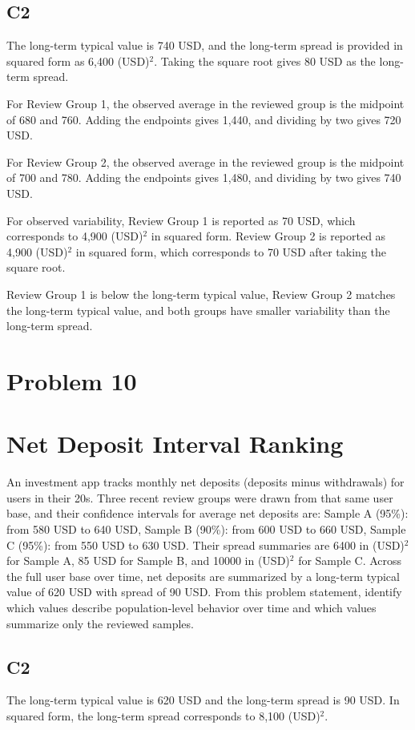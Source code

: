 \begin{ExamProblems}
\subsection*{C2}
		The long-term typical value is 740 USD, and the long-term spread is provided in squared form as 6,400 (USD)$^2$.
		Taking the square root gives 80 USD as the long-term spread.

		For Review Group 1, the observed average in the reviewed group is the midpoint of 680 and 760.
		Adding the endpoints gives 1,440, and dividing by two gives 720 USD.

		For Review Group 2, the observed average in the reviewed group is the midpoint of 700 and 780.
		Adding the endpoints gives 1,480, and dividing by two gives 740 USD.

		For observed variability, Review Group 1 is reported as 70 USD, which corresponds to 4,900 (USD)$^2$ in squared form.
		Review Group 2 is reported as 4,900 (USD)$^2$ in squared form, which corresponds to 70 USD after taking the square root.

		Review Group 1 is below the long-term typical value, Review Group 2 matches the long-term typical value, and both groups have smaller variability than the long-term spread.


		\newpage
		\item
		\section{Problem 10}
		\section{Net Deposit Interval Ranking}
		An investment app tracks monthly net deposits (deposits minus withdrawals) for users in their 20s.
		Three recent review groups were drawn from that same user base, and their confidence intervals for average net deposits are:
		Sample A (95\%): from 580 USD to 640 USD,
		Sample B (90\%): from 600 USD to 660 USD,
		Sample C (95\%): from 550 USD to 630 USD.
		Their spread summaries are 6400 in (USD)$^2$ for Sample A, 85 USD for Sample B, and 10000 in (USD)$^2$ for Sample C.
		Across the full user base over time, net deposits are summarized by a long-term typical value of 620 USD with spread of 90 USD.
		From this problem statement, identify which values describe population-level behavior over time and which values summarize only the reviewed samples.

\subsection*{C2}
		The long-term typical value is 620 USD and the long-term spread is 90 USD.
		In squared form, the long-term spread corresponds to 8,100 (USD)$^2$.


\end{ExamProblems}
